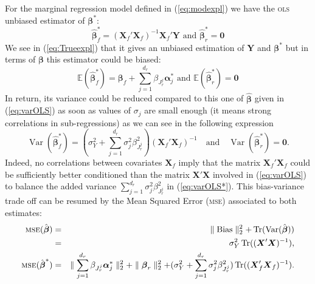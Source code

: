 \documentclass[12pt,a4paper]{report}
\begin{document}
For the marginal regression model defined in (\ref{eq:modexpl})
we have the \textsc{ols} unbiased estimator of $\boldsymbol{\beta}^*$: 
		\begin{equation}
			\hat{\boldsymbol{\beta}}_{f}^* = (\boldsymbol{X}_{f}'\boldsymbol{X}_{f})^{-1}\boldsymbol{X}_{f}'\boldsymbol{Y}  \textrm{ and }\boldsymbol{\hat\beta}_{r}^* = \boldsymbol{0} \nonumber 
		\end{equation}
		We see in (\ref{eq:Trueexpl}) that it gives an unbiased estimation of $\boldsymbol{Y}$ and $\boldsymbol{\beta^*}$
		but in terms of $\boldsymbol{\beta}$ this estimator could be biased:
		\begin{equation}
			\mathbb{E}(\hat{\boldsymbol{\beta}}_{f}^*)=\boldsymbol{\beta}_{f}+\sum_{j =1}^{d_r}\beta_{J_r^j}\boldsymbol{\alpha}_j^* \textrm{ and }\mathbb{E}(\hat{\boldsymbol{\beta}}_{r}^*)=\boldsymbol{0}  \nonumber 
		\end{equation}
		In return, its variance could be reduced compared to this one of $\hat{\boldsymbol{\beta}}$ given in (\ref{eq:varOLS}) as soon as values of $\sigma_j$ are small enough (it means strong correlations in sub-regressions) as we can see in the following expression
		\begin{equation}
			\operatorname{Var}(\hat{\boldsymbol{\beta}}_f^*)= (\sigma^2_Y+\sum_{j =1}^{d_r}\sigma^2_{j}\beta_{J_r^j}^2)(\boldsymbol{X}_f' \boldsymbol{X}_f)^{-1} \quad \textrm{and} \quad\operatorname{Var}(\hat{\boldsymbol{\beta}}_r^*)= \boldsymbol{0}. \label{eq:varOLS*}
		\end{equation}
Indeed, no correlations between covariates $\boldsymbol{X}_f$ imply that the matrix $\boldsymbol{X}_f' \boldsymbol{X}_f$ could be sufficiently better conditioned than the matrix $\boldsymbol{X}' \boldsymbol{X}$ involved in (\ref{eq:varOLS}) to balance the added variance $\sum_{j =1}^{d_r}\sigma^2_{j}\beta_{J_r^j}^2$ in (\ref{eq:varOLS*}). This bias-variance trade off can be resumed by the Mean Squared Error (\textsc{mse}) associated to both estimates:
	\begin{eqnarray}
	\textsc{mse}(\hat{\boldsymbol{\beta}})&=&\parallel \operatorname{Bias}\parallel_2^2+\operatorname{Tr}(\operatorname{Var}(\hat{\boldsymbol{\beta}}))  \nonumber \\
			&=& \sigma_Y^2 \operatorname{Tr}((\boldsymbol{X}'\boldsymbol{X})^{-1}),
			 \nonumber  \\
			\textsc{mse}(\hat{\boldsymbol{\beta}}^*)&=& \parallel\sum_{j =1}^{d_r}\beta_{J_r^j}\boldsymbol{\alpha}_j^* \parallel_2^2 +\parallel \boldsymbol{\beta}_r\parallel^2_2 + (\sigma^2_Y+\sum_{j =1}^{d_r}\sigma^2_{j}\beta_{J_r^j}^2 ) \operatorname{Tr}((\boldsymbol{X}_f' \boldsymbol{X}_f)^{-1}). \nonumber 
	\end{eqnarray}	 
\end{document}
